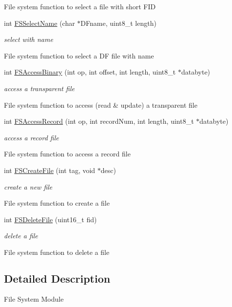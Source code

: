 \begin{DoxyCompactItemize}
\begin{DoxyCompactList}
File system function to select a file with short F\-I\-D \end{DoxyCompactList}\item 
int \hyperlink{group__fs_ga697390f044810e38c9308d12109487a9}{F\-S\-Select\-Name} (char $\ast$D\-Fname, uint8\-\_\-t length)
\begin{DoxyCompactList}\small\item\em select with name

File system function to select a D\-F file with name \end{DoxyCompactList}\item 
int \hyperlink{group__fs_ga9f8915bf60a20928be8f7ab9a5750309}{F\-S\-Access\-Binary} (int op, int offset, int length, uint8\-\_\-t $\ast$databyte)
\begin{DoxyCompactList}\small\item\em access a transparent file

File system function to access (read \& update) a transparent file \end{DoxyCompactList}\item 
int \hyperlink{group__fs_gadee7ce5359cf03ffb89420e4012ca8b9}{F\-S\-Access\-Record} (int op, int record\-Num, int length, uint8\-\_\-t $\ast$databyte)
\begin{DoxyCompactList}\small\item\em access a record file

File system function to access a record file \end{DoxyCompactList}\item 
int \hyperlink{group__fs_ga57bbc0e2b610758d6710826166345004}{F\-S\-Create\-File} (int tag, void $\ast$desc)
\begin{DoxyCompactList}\small\item\em create a new file

File system function to create a file \end{DoxyCompactList}\item 
int \hyperlink{group__fs_gab24d6b7331b45fa5ad94f87244f4ce29}{F\-S\-Delete\-File} (uint16\-\_\-t fid)
\begin{DoxyCompactList}\small\item\em delete a file

File system function to delete a file \end{DoxyCompactList}\end{DoxyCompactItemize}


\subsection{Detailed Description}
File System Module 

